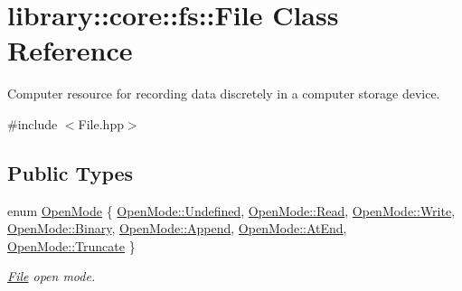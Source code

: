 \hypertarget{classlibrary_1_1core_1_1fs_1_1_file}{}\section{library\+:\+:core\+:\+:fs\+:\+:File Class Reference}
\label{classlibrary_1_1core_1_1fs_1_1_file}


Computer resource for recording data discretely in a computer storage device.  




{\ttfamily \#include $<$File.\+hpp$>$}

\subsection*{Public Types}
\begin{DoxyCompactItemize}
\item 
enum \hyperlink{classlibrary_1_1core_1_1fs_1_1_file_ac18b7d7ee50c803cbd0087b0f71ce4f7}{Open\+Mode} \{ \newline
\hyperlink{classlibrary_1_1core_1_1fs_1_1_file_ac18b7d7ee50c803cbd0087b0f71ce4f7aec0fc0100c4fc1ce4eea230c3dc10360}{Open\+Mode\+::\+Undefined}, 
\hyperlink{classlibrary_1_1core_1_1fs_1_1_file_ac18b7d7ee50c803cbd0087b0f71ce4f7a7a1a5f3e79fdc91edf2f5ead9d66abb4}{Open\+Mode\+::\+Read}, 
\hyperlink{classlibrary_1_1core_1_1fs_1_1_file_ac18b7d7ee50c803cbd0087b0f71ce4f7a1129c0e4d43f2d121652a7302712cff6}{Open\+Mode\+::\+Write}, 
\hyperlink{classlibrary_1_1core_1_1fs_1_1_file_ac18b7d7ee50c803cbd0087b0f71ce4f7a6ce976e8f061b2b5cfe4d0c50c3405dd}{Open\+Mode\+::\+Binary}, 
\newline
\hyperlink{classlibrary_1_1core_1_1fs_1_1_file_ac18b7d7ee50c803cbd0087b0f71ce4f7a3ac4692f3935a49a0b243eecf529faa9}{Open\+Mode\+::\+Append}, 
\hyperlink{classlibrary_1_1core_1_1fs_1_1_file_ac18b7d7ee50c803cbd0087b0f71ce4f7a8d04b2d09dcc744cf134542097642db5}{Open\+Mode\+::\+At\+End}, 
\hyperlink{classlibrary_1_1core_1_1fs_1_1_file_ac18b7d7ee50c803cbd0087b0f71ce4f7aa8156810bfee2bd2b44765b9e91db3bd}{Open\+Mode\+::\+Truncate}
 \}\begin{DoxyCompactList}\small\item\em \hyperlink{classlibrary_1_1core_1_1fs_1_1_file}{File} open mode. \end{DoxyCompactList}
\end{DoxyCompactItemize}
